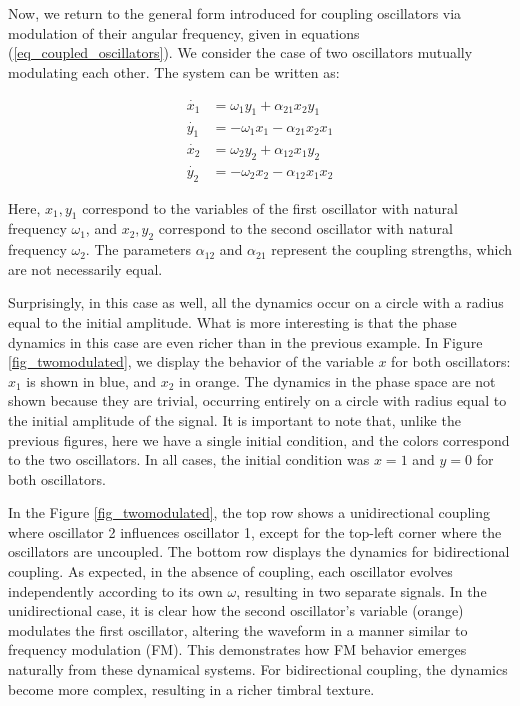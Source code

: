 \documentclass{article}
\begin{document}
Now, we return to the general form introduced for coupling oscillators via modulation of their angular frequency, given in equations (\ref{eq_coupled_oscillators}). 
We consider the case of two oscillators mutually modulating each other. The system can be written as:


\begin{subequations} \label{eq_twomodulated}
\begin{align}
    \dot{x_1} & = \omega_1 y_1+ \alpha_{21} x_2 y_1 \\
    \dot{y_1} & = -\omega_1 x_1 - \alpha_{21} x_2 x_1 \\
    \dot{x_2} & = \omega_2 y_2+ \alpha_{12} x_1 y_2 \\
    \dot{y_2} & = -\omega_2 x_2 - \alpha_{12} x_1 x_2 
\end{align}
\end{subequations}

Here, $x_1, y_1$ correspond to the variables of the first oscillator with natural frequency $\omega_1$, and $x_2, y_2$ correspond to the second oscillator with natural frequency $\omega_2$. The parameters $\alpha_{12}$ and $\alpha_{21}$ represent the coupling strengths, which are not necessarily equal.

Surprisingly, in this case as well, all the dynamics occur on a circle with a radius equal to the initial amplitude. 
What is more interesting is that the phase dynamics in this case are even richer than in the previous example. 
In Figure \ref{fig_twomodulated}, we display the behavior of the variable $x$ for both oscillators: $x_1$ is shown in blue, and $x_2$ in orange. 
The dynamics in the phase space are not shown because they are trivial, occurring entirely on a circle with 
radius equal to the initial amplitude of the signal. 
It is important to note that, unlike the previous figures, here we have a single initial condition, and the colors correspond to the two oscillators. 
In all cases, the initial condition was $x = 1$ and $y = 0$ for both oscillators.

In the Figure \ref{fig_twomodulated}, the top row shows a unidirectional coupling where oscillator 2 influences oscillator 1, except for the top-left corner where the oscillators are uncoupled. 
The bottom row displays the dynamics for bidirectional coupling. 
As expected, in the absence of coupling, each oscillator evolves independently according to its own $\omega$, resulting in two separate signals. 
In the unidirectional case, it is clear how the second oscillator's variable (orange) modulates the first oscillator, altering the waveform in a manner similar to frequency modulation (FM). 
This demonstrates how FM behavior emerges naturally from these dynamical systems. 
For bidirectional coupling, the dynamics become more complex, resulting in a richer timbral texture.
\end{document}
